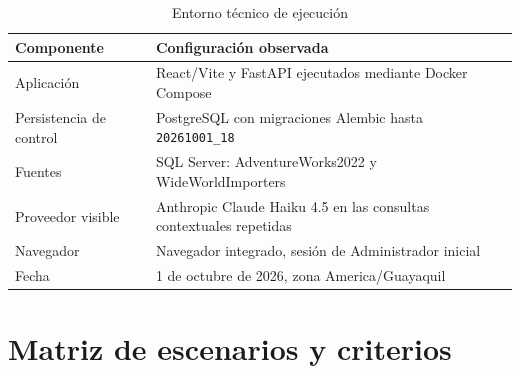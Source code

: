 \documentclass[11pt,letterpaper]{article}
\newcommand{\file}[1]{\texttt{#1}}
\begin{document}
\begin{table}[H]
\centering
\caption{Entorno técnico de ejecución}
\begin{tabularx}{\textwidth}{@{}p{}X@{}}
\toprule
Componente & Configuración observada \\
\midrule
Aplicación & React/Vite y FastAPI ejecutados mediante Docker Compose \\
Persistencia de control & PostgreSQL con migraciones Alembic hasta \file{20261001\_18} \\
Fuentes & SQL Server: AdventureWorks2022 y WideWorldImporters \\
Proveedor visible & Anthropic Claude Haiku 4.5 en las consultas contextuales repetidas \\
Navegador & Navegador integrado, sesión de Administrador inicial \\
Fecha & 1 de octubre de 2026, zona America/Guayaquil \\
\bottomrule
\end{tabularx}
\end{table}

\section{Matriz de escenarios y criterios}
\end{document}
